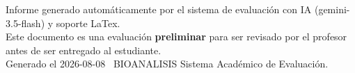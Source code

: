 \documentclass[11pt,a4paper]{article}
\begin{document}
\vspace{12pt}
\begin{center}
  \footnotesize\color{gray}
  Informe generado automáticamente por el sistema de evaluación con IA (gemini-3.5-flash) y soporte LaTex. \\
  Este documento es una evaluación \textbf{preliminar} para ser revisado por el profesor antes de ser entregado al 
  estudiante. \\
  Generado el 2026-08-08 \textbullet\ BIOANALISIS Sistema Académico de Evaluación.
  \end{center}
\end{document}
